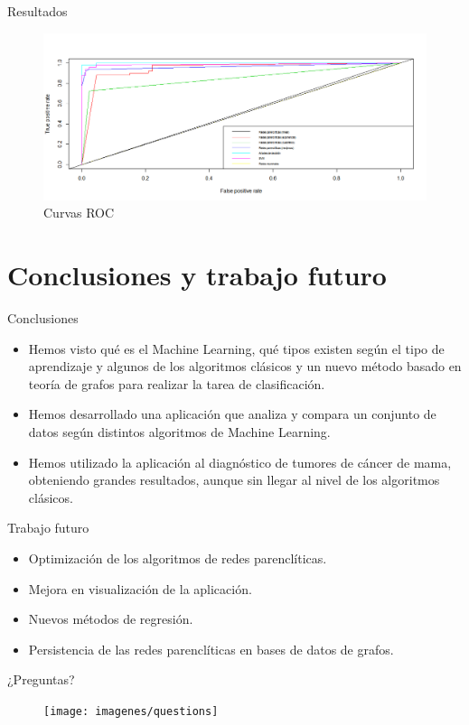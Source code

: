 \documentclass[hyperref={unicode}]{beamer}
\begin{document}
\begin{frame}{Resultados}
\begin{figure}
\begin{center}
			\includegraphics[width=\linewidth]{../memoria/imagenes/cancer/ROC_cancer.png}
		\end{center}
	\caption{Curvas ROC}
\end{figure}
\end{frame}

\section{Conclusiones y trabajo futuro}
\begin{frame}{Conclusiones}
	\begin{itemize}
	\item Hemos visto qué es el Machine Learning, qué tipos existen según el tipo de aprendizaje y algunos de los algoritmos clásicos y un nuevo método basado en teoría de grafos para realizar la tarea de clasificación. 
	
	\item Hemos desarrollado una aplicación que analiza y compara un conjunto de datos según distintos algoritmos de Machine Learning.
	
	\item Hemos utilizado la aplicación al diagnóstico de tumores de cáncer de mama, obteniendo grandes resultados, aunque sin llegar al nivel de los algoritmos clásicos.
	\end{itemize}
\end{frame}

\begin{frame}{Trabajo futuro}
	\begin{itemize}
		\item Optimización de los algoritmos de redes parenclíticas.
		 
		\item Mejora en visualización de la aplicación.
		
		\item Nuevos métodos de regresión.
		
		\item Persistencia de las redes parenclíticas en bases de datos de grafos.
	\end{itemize}
\end{frame}

\begin{frame}{¿Preguntas?}
	\begin{figure}
	\begin{center}
		\texttt{[image: imagenes/questions]}
	\end{center}

	\end{figure}


\end{frame}
\end{document}
